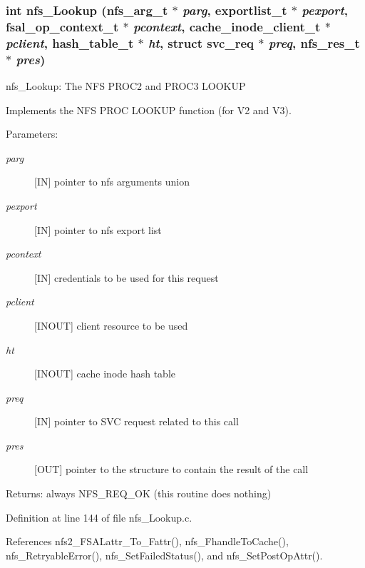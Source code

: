 \subsubsection{\setlength{\rightskip}{0pt plus 5cm}int nfs\_\-Lookup (nfs\_\-arg\_\-t $\ast$ {\em parg}, exportlist\_\-t $\ast$ {\em pexport}, fsal\_\-op\_\-context\_\-t $\ast$ {\em pcontext}, cache\_\-inode\_\-client\_\-t $\ast$ {\em pclient}, hash\_\-table\_\-t $\ast$ {\em ht}, struct svc\_\-req $\ast$ {\em preq}, nfs\_\-res\_\-t $\ast$ {\em pres})}\label{nfs__Lookup_8c_a0}


nfs\_\-Lookup: The NFS PROC2 and PROC3 LOOKUP

Implements the NFS PROC LOOKUP function (for V2 and V3).

\begin{Desc}
\item[Parameters:]
\begin{description}
\item[{\em parg}][IN] pointer to nfs arguments union \item[{\em pexport}][IN] pointer to nfs export list \item[{\em pcontext}][IN] credentials to be used for this request \item[{\em pclient}][INOUT] client resource to be used \item[{\em ht}][INOUT] cache inode hash table \item[{\em preq}][IN] pointer to SVC request related to this call \item[{\em pres}][OUT] pointer to the structure to contain the result of the call\end{description}
\end{Desc}
\begin{Desc}
\item[Returns:]always NFS\_\-REQ\_\-OK (this routine does nothing) \end{Desc}


Definition at line 144 of file nfs\_\-Lookup.c.

References nfs2\_\-FSALattr\_\-To\_\-Fattr(), nfs\_\-Fhandle\-To\-Cache(), nfs\_\-Retryable\-Error(), nfs\_\-Set\-Failed\-Status(), and nfs\_\-Set\-Post\-Op\-Attr().